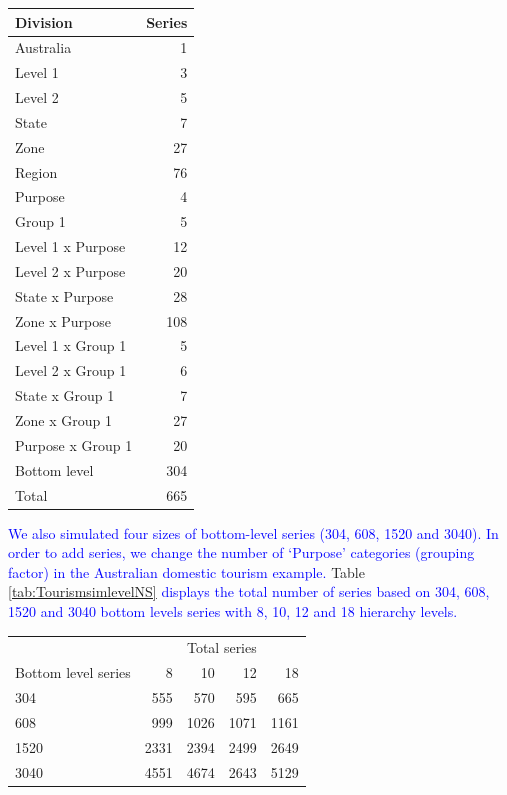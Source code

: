 \documentclass[11pt,a4paper,]{article}
\let\origtable\table
\let\endorigtable\endtable
\renewenvironment{table}[1][2] {
    \expandafter\origtable\expandafter[!htbp]
} {
    \endorigtable
}
\begin{document}
\begin{table}[!h]

\caption{\label{tab:simlevel1level2group1}Number of simulated Australian domestic tourism series at each aggregation level - adding two hierarchy and one grouping variables (Level 1, Level 2 and Group 1)}
\centering
\begin{tabular}[t]{lr}
\toprule
Division & Series\\
\midrule
Australia & 1\\
Level 1 & 3\\
Level 2 & 5\\
State & 7\\
Zone & 27\\
Region & 76\\
Purpose & 4\\
Group 1 & 5\\
Level 1 x Purpose & 12\\
Level 2 x Purpose & 20\\
State x Purpose & 28\\
Zone x Purpose & 108\\
Level 1 x Group 1 & 5\\
Level 2 x Group 1 & 6\\
State x Group 1 & 7\\
Zone x Group 1 & 27\\
Purpose x Group 1 & 20\\
Bottom level & 304\\
\hline
Total & 665\\
\bottomrule
\end{tabular}
\end{table}

\textcolor{blue}{ We also simulated four  sizes of bottom-level series (304, 608, 1520 and 3040). In order to add series, we change the number of ‘Purpose’ categories (grouping factor) in the Australian domestic tourism example.} Table \ref{tab:TourismsimlevelNS} \textcolor{blue}{displays the total number of series based on 304, 608, 1520 and 3040 bottom levels series with 8, 10, 12 and 18 hierarchy levels.}

\begin{table}

\caption{\label{tab:TourismsimlevelNS}Total number of the series in the hierarchy structure based on the different number of series with 8, 10, 12 and 18 levels of the hierarchy.}
\centering
\begin{tabular}[t]{lrrrr}
\toprule
\multicolumn{1}{c}{} & \multicolumn{4}{c}{Total series} \\
\cmidrule(l{3pt}r{3pt}){2-5}
Bottom level series & 8 & 10 & 12 & 18\\
\midrule
304 & 555 & 570 & 595 & 665\\
608 & 999 & 1026 & 1071 & 1161\\
1520 & 2331 & 2394 & 2499 & 2649\\
3040 & 4551 & 4674 & 2643 & 5129\\
\bottomrule
\end{tabular}
\end{table}
\end{document}
